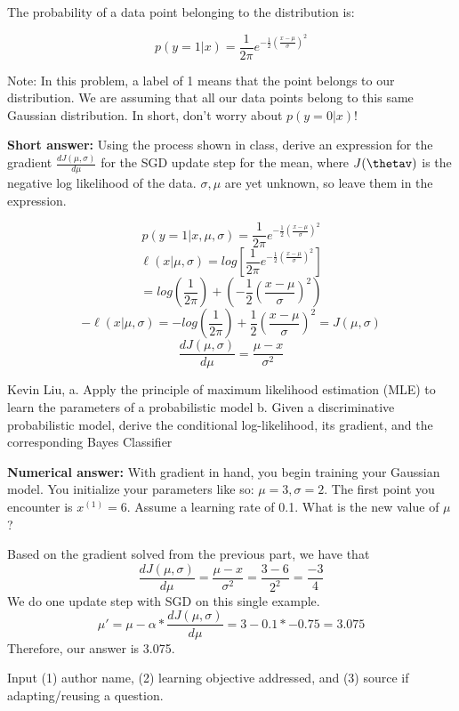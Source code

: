 \begin{parts}
The probability of a data point belonging to the distribution is:
\begin{center}
    \[p(y = 1 | x) = \frac{1}{2 \pi} e^{-\frac{1}{2}(\frac{x-\mu}{\sigma})^2}\]
\end{center}
Note: In this problem, a label of 1 means that the point belongs to our distribution. We are assuming that all our data points belong to this same Gaussian distribution. In short, don't worry about $p(y=0 | x)$!
    \noaddpoints %
    \begin{subparts}
    \subpart[10] \textbf{Short answer:} Using the process shown in class, derive an expression for the gradient $\frac{d J(\mu, \sigma)}{d \mu}$ for the SGD update step for the mean, where $J(\thetav)$ is the negative log likelihood of the data. $\sigma, \mu$ are yet unknown, so leave them in the expression.
    \fillwithlines{2em}
    \begin{soln}
    \[p(y = 1 | x, \mu, \sigma) = \frac{1}{2 \pi} e^{-\frac{1}{2}(\frac{x-\mu}{\sigma})^2}\]
    \[\ell(x | \mu, \sigma) = log[\frac{1}{2 \pi} e^{-\frac{1}{2}(\frac{x-\mu}{\sigma})^2}]\]
    \[ = log(\frac{1}{2 \pi}) + (-\frac{1}{2}(\frac{x-\mu}{\sigma})^2)\]
    \[-\ell(x | \mu, \sigma) = -log(\frac{1}{2 \pi}) + \frac{1}{2}(\frac{x-\mu}{\sigma})^2 = J(\mu, \sigma)\]
    \[\frac{d J(\mu, \sigma)}{d \mu} = \frac{\mu - x}{\sigma^2}\]
    \end{soln}
    \begin{qauthor}
    Kevin Liu,
    a. Apply the principle of maximum likelihood estimation (MLE) to learn the parameters
    of a probabilistic model
    b. Given a discriminative probabilistic model, derive the conditional log-likelihood, its
    gradient, and the corresponding Bayes Classifier
    \end{qauthor} 
    \subpart[10] \textbf{Numerical answer:} With gradient in hand, you begin training your Gaussian model. You initialize your parameters like so: $\mu = 3, \sigma = 2$. The first point you encounter is $x^{(1)} = 6$. Assume a learning rate of 0.1. What is the new value of $\mu$?
    \begin{tcolorbox}[fit,height=1cm, width=2cm, blank, borderline={1pt}{-2pt}]
    \end{tcolorbox}
    \begin{soln}
    Based on the gradient solved from the previous part, we have that
    \[\frac{d J(\mu, \sigma)}{d \mu} = \frac{\mu - x}{\sigma^2} = \frac{3 - 6}{2 ^2} = \frac{-3}{4}\]
    We do one update step with SGD on this single example.
    \[\mu' = \mu - \alpha * \frac{d J(\mu, \sigma)}{d \mu} = 3 - 0.1 * -0.75 = 3.075 \]
    Therefore, our answer is 3.075.
    \end{soln}
    \begin{qauthor}
    Input (1) author name, (2) learning objective addressed, and (3) source if  adapting/reusing a question.
    \end{qauthor}
    \end{subparts}
    \addpoints
    


\end{parts}
